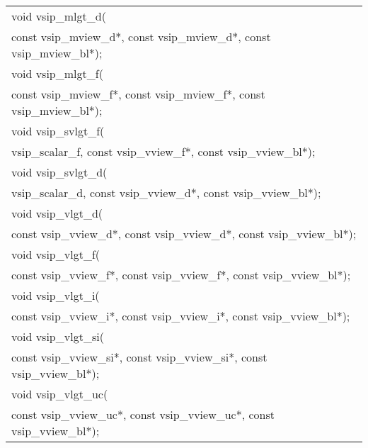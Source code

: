 \\\cvsiplh
\afh
{
\ttfamily
\\\hspace*{.04\textwidth}\begin{tabular}[H]{l}
void vsip\_mlgt\_d(\\*\hspace{1cm}const vsip\_mview\_d*, const vsip\_mview\_d*, const vsip\_mview\_bl*);\\
void vsip\_mlgt\_f(\\*\hspace{1cm}const vsip\_mview\_f*, const vsip\_mview\_f*, const vsip\_mview\_bl*);\\
void vsip\_svlgt\_f(\\*\hspace{1cm}vsip\_scalar\_f, const vsip\_vview\_f*, const vsip\_vview\_bl*);\\
void vsip\_svlgt\_d(\\*\hspace{1cm}vsip\_scalar\_d, const vsip\_vview\_d*, const vsip\_vview\_bl*);\\
void vsip\_vlgt\_d(\\*\hspace{1cm}const vsip\_vview\_d*, const vsip\_vview\_d*, const vsip\_vview\_bl*);\\
void vsip\_vlgt\_f(\\*\hspace{1cm}const vsip\_vview\_f*, const vsip\_vview\_f*, const vsip\_vview\_bl*);\\
void vsip\_vlgt\_i(\\*\hspace{1cm}const vsip\_vview\_i*, const vsip\_vview\_i*, const vsip\_vview\_bl*);\\
void vsip\_vlgt\_si(\\*\hspace{1cm}const vsip\_vview\_si*, const vsip\_vview\_si*, const vsip\_vview\_bl*);\\
void vsip\_vlgt\_uc(\\*\hspace{1cm}const vsip\_vview\_uc*, const vsip\_vview\_uc*, const vsip\_vview\_bl*);\\
\end{tabular}
}
\\\pyjvsiph
{}

